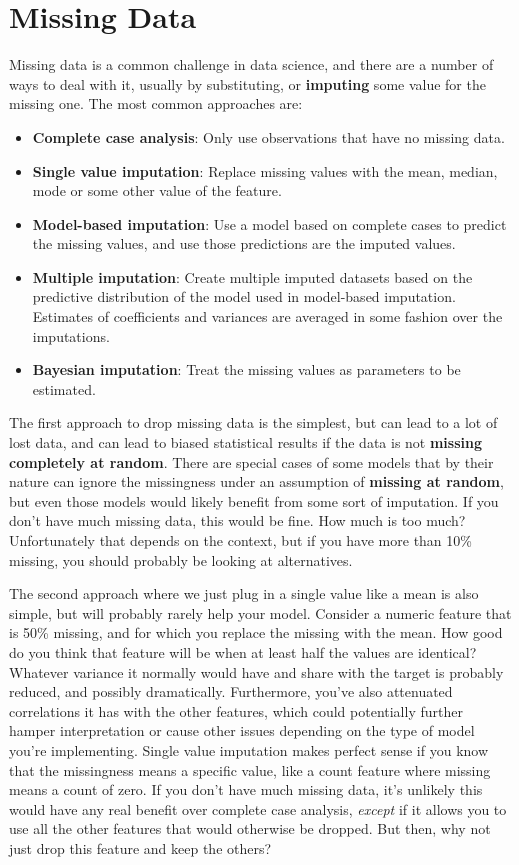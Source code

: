 \documentclass[
  letterpaper,
]{krantz}
\providecommand{\tightlist}{%
  \setlength{\itemsep}{0pt}\setlength{\parskip}{0pt}}\usepackage{longtable,booktabs,array}
\begin{document}
\section{Missing Data}\label{sec-missing-data}

Missing data is a common challenge in data science, and there are a
number of ways to deal with it, usually by substituting, or
\textbf{imputing} some value for the missing one. The most common
approaches are:

\begin{itemize}
\tightlist
\item
  \textbf{Complete case analysis}: Only use observations that have no
  missing data.
\item
  \textbf{Single value imputation}: Replace missing values with the
  mean, median, mode or some other value of the feature.
\item
  \textbf{Model-based imputation}: Use a model based on complete cases
  to predict the missing values, and use those predictions are the
  imputed values.
\item
  \textbf{Multiple imputation}: Create multiple imputed datasets based
  on the predictive distribution of the model used in model-based
  imputation. Estimates of coefficients and variances are averaged in
  some fashion over the imputations.
\item
  \textbf{Bayesian imputation}: Treat the missing values as parameters
  to be estimated.
\end{itemize}

The first approach to drop missing data is the simplest, but can lead to
a lot of lost data, and can lead to biased statistical results if the
data is not \textbf{missing completely at random}. There are special
cases of some models that by their nature can ignore the missingness
under an assumption of \textbf{missing at random}, but even those models
would likely benefit from some sort of imputation. If you don't have
much missing data, this would be fine. How much is too much?
Unfortunately that depends on the context, but if you have more than
10\% missing, you should probably be looking at alternatives.

The second approach where we just plug in a single value like a mean is
also simple, but will probably rarely help your model. Consider a
numeric feature that is 50\% missing, and for which you replace the
missing with the mean. How good do you think that feature will be when
at least half the values are identical? Whatever variance it normally
would have and share with the target is probably reduced, and possibly
dramatically. Furthermore, you've also attenuated correlations it has
with the other features, which could potentially further hamper
interpretation or cause other issues depending on the type of model
you're implementing. Single value imputation makes perfect sense if you
know that the missingness means a specific value, like a count feature
where missing means a count of zero. If you don't have much missing
data, it's unlikely this would have any real benefit over complete case
analysis, \emph{except} if it allows you to use all the other features
that would otherwise be dropped. But then, why not just drop this
feature and keep the others?
\end{document}
